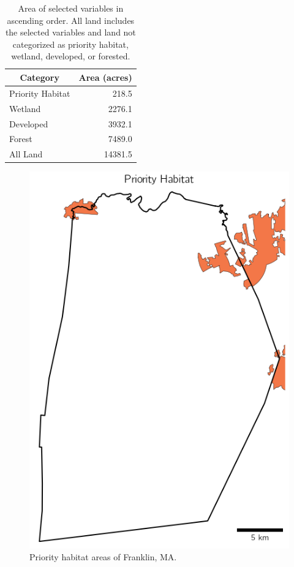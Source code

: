 \documentclass[12pt, stu, floatsintext,table]{apa7}
\begin{document}
\begin{table}[]
\centering
\caption{Area of selected variables in ascending order. All land includes the selected variables and land not categorized as priority habitat, wetland, developed, or forested. }
\begin{tabular}{@{}lr@{}}
\toprule
\multicolumn{1}{c}{Category} & \multicolumn{1}{c}{Area (acres)} \\ \midrule
Priority Habitat             & 218.5                            \\
Wetland                      & 2276.1                           \\
Developed                    & 3932.1                           \\
Forest                       & 7489.0                           \\
All Land                     & 14381.5                          \\ \bottomrule
\end{tabular}
\end{table}

\begin{figure}[H]
    \centering
    \includegraphics[width=0.75\linewidth]{figures/prihab_cover.png}
    \caption{Priority habitat areas of Franklin, MA.  }
\end{figure}
\end{document}
